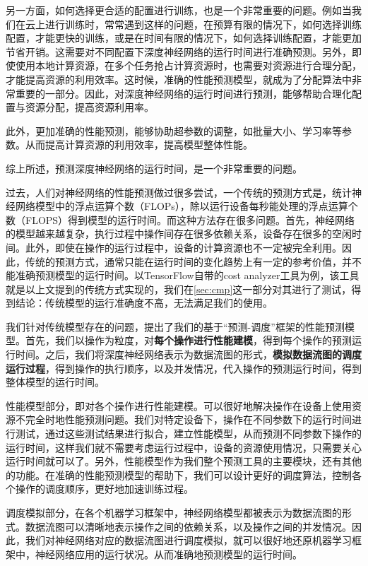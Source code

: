     另一方面，如何选择更合适的配置进行训练，也是一个非常重要的问题。例如当我们在云上进行训练时，常常遇到这样的问题，在预算有限的情况下，如何选择训练配置，才能更快的训练，或是在时间有限的情况下，如何选择训练配置，才能更加节省开销。这需要对不同配置下深度神经网络的运行时间进行准确预测。另外，即使使用本地计算资源，在多个任务抢占计算资源时，也需要对资源进行合理分配，才能提高资源的利用效率。这时候，准确的性能预测模型，就成为了分配算法中非常重要的一部分。因此，对深度神经网络的运行时间进行预测，能够帮助合理化配置与资源分配，提高资源利用率。
    
    此外，更加准确的性能预测，能够协助超参数的调整，如批量大小、学习率等参数。从而提高计算资源的利用效率，提高模型整体性能。
    
    综上所述，预测深度神经网络的运行时间，是一个非常重要的问题。
    
    过去，人们对神经网络的性能预测做过很多尝试，一个传统的预测方式是，统计神经网络模型中的浮点运算个数（FLOPs），除以运行设备每秒能处理的浮点运算个数（FLOPS）得到模型的运行时间。而这种方法存在很多问题。首先，神经网络的模型越来越复杂，执行过程中操作间存在很多依赖关系，设备存在很多的空闲时间。此外，即使在操作的运行过程中，设备的计算资源也不一定被完全利用。因此，传统的预测方式，通常只能在运行时间的变化趋势上有一定的参考价值，并不能准确预测模型的运行时间。以TensorFlow自带的cost analyzer工具为例，该工具就是以上文提到的传统方式实现的，我们在\ref{sec:cmp}这一部分对其进行了测试，得到结论：传统模型的运行准确度不高，无法满足我们的使用。
    
    我们针对传统模型存在的问题，提出了我们的基于“预测-调度”框架的性能预测模型。首先，我们以操作为粒度，对{\bfseries 每个操作进行性能建模}，得到每个操作的预测运行时间。之后，我们将深度神经网络表示为数据流图的形式，{\bfseries 模拟数据流图的调度运行过程}，得到操作的执行顺序，以及并发情况，代入操作的预测运行时间，得到整体模型的运行时间。
    
    性能模型部分，即对各个操作进行性能建模。可以很好地解决操作在设备上使用资源不完全时地性能预测问题。我们对特定设备下，操作在不同参数下的运行时间进行测试，通过这些测试结果进行拟合，建立性能模型，从而预测不同参数下操作的运行时间，这样我们就不需要考虑运行过程中，设备的资源使用情况，只需要关心运行时间就可以了。另外，性能模型作为我们整个预测工具的主要模块，还有其他的功能。在准确的性能预测模型的帮助下，我们可以设计更好的调度算法，控制各个操作的调度顺序，更好地加速训练过程。
    
    调度模拟部分，在各个机器学习框架中，神经网络模型都被表示为数据流图的形式。数据流图可以清晰地表示操作之间的依赖关系，以及操作之间的并发情况。因此，我们对神经网络对应的数据流图进行调度模拟，就可以很好地还原机器学习框架中，神经网络应用的运行状况。从而准确地预测模型的运行时间。
    
